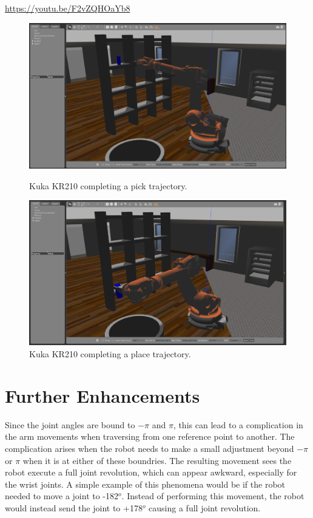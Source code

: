 \documentclass[a4paper]{article}
\begin{document}
\begin{center}
	\url{https://youtu.be/F2vZQHOaYb8}
\end{center}

\begin{figure}[h]
	\centering
	\begin{minipage}{0.45\textwidth}
		\centering
		\includegraphics[scale=0.1]{pick}
		\caption{Kuka KR210 completing a pick trajectory.}
	\end{minipage}
	\hspace{1cm}
	\begin{minipage}{0.45\textwidth}
		\centering
		\includegraphics[scale=0.1]{place}
		\caption{Kuka KR210 completing a place trajectory.}
	\end{minipage}
\end{figure}

\newpage

\section{Further Enhancements}
Since the joint angles are bound to $-\pi$ and $\pi$, this can lead to a complication in the arm movements when traversing from one reference point to another. The complication arises when the robot needs to make a small adjustment beyond $-\pi$ or $\pi$ when it is at either of these boundries. The resulting movement sees the robot execute a full joint revolution, which can appear awkward, especially for the wrist joints. A simple example of this phenomena would be if the robot needed to move a joint to -182$^o$. Instead of performing this movement, the robot would instead send the joint to +178$^o$ causing a full joint revolution.\\
\end{document}
